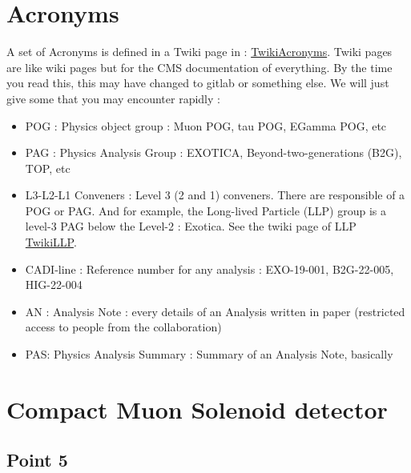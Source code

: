 \documentclass[reprint, a4paper, nofootinbib, amsmath, amssymb, aps]{revtex4-1}
\begin{document}
\section{Acronyms}
    A set of Acronyms is defined in a Twiki page in : \href{https://twiki.cern.ch/twiki/bin/view/CMSPublic/WorkBookGlossary}{TwikiAcronyms}. Twiki pages are like wiki pages but for the CMS documentation of everything. By the time you read this, this may have changed to gitlab or something else. We will just give some that you may encounter rapidly :
    \begin{itemize}
        \item POG : Physics object group : Muon POG, tau POG, EGamma POG, etc
        \item PAG : Physics Analysis Group : EXOTICA, Beyond-two-generations (B2G), TOP, etc
        \item L3-L2-L1 Conveners : Level 3 (2 and 1) conveners. There are responsible of a POG or PAG. And for example, the Long-lived Particle (LLP) group is a level-3 PAG below the Level-2 : Exotica. See the twiki page of LLP \href{https://twiki.cern.ch/twiki/bin/viewauth/CMS/ExoticaLongLived}{TwikiLLP}.
        \item CADI-line : Reference number for any analysis : EXO-19-001, B2G-22-005, HIG-22-004
        \item AN : Analysis Note : every details of an Analysis written in paper (restricted access to people from the collaboration)
        \item PAS: Physics Analysis Summary : Summary of an Analysis Note, basically
    \end{itemize}
\section{Compact Muon Solenoid detector }
    
    \subsection{Point 5}
\end{document}
